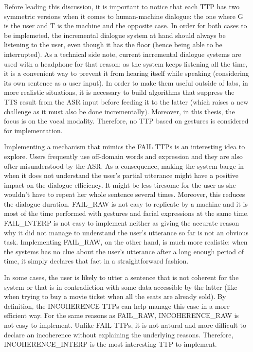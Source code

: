           Before leading this discussion, it is important to notice that each TTP has two symmetric versions when it comes to human-machine dialogue: the one where G is the user and T is the machine and the opposite case. In order for both cases to be implemeted, the incremental dialogue system at hand should always be listening to the user, even though it has the floor (hence being able to be interrupted). As a technical side note, current incremental dialogue systems are used with a headphone for that reason: as the system keeps listening all the time, it is a convenient way to prevent it from hearing itself while speaking (considering its own sentence as a user input). In order to make them useful outside of labs, in more realistic situations, it is necessary to build algorithms that suppress the TTS result from the ASR input before feeding it to the latter (which raises a new challenge as it must also be done incrementally). Moreover, in this thesis, the focus is on the vocal modality. Therefore, no TTP based on gestures is considered for implementation.

          Implementing a mechanism that mimics the FAIL TTPs is an interesting idea to explore. Users frequently use off-domain words and expression \cite{Ghigi2014} and they are also ofter misunderstood by the ASR. As a consequence, making the system barge-in when it does not understand the user's partial utterance might have a positive impact on the dialogue efficiency. It might be less tiresome for the user as she wouldn't have to repeat her whole sentence several times. Moreover, this reduces the dialogue duration. FAIL\_RAW is not easy to replicate by a machine and it is most of the time performed with gestures and facial expressions at the same time. FAIL\_INTERP is not easy to implement neither as giving the accurate reason why it did not manage to understand the user's utterance so far is not an obvious task. Implementing FAIL\_RAW, on the other hand, is much more realistic: when the systems has no clue about the user's utterance after a long enough period of time, it simply declares that fact in a straightforward fashion.

          In some cases, the user is likely to utter a sentence that is not coherent for the system or that is in contradiction with some data accessible by the latter (like when trying to buy a movie ticket when all the seats are already sold). By definition, the INCOHERENCE TTPs can help manage this case in a more efficient way. For the same reasons as FAIL\_RAW, INCOHERENCE\_RAW is not easy to implement. Unlike FAIL TTPs, it is not natural and more difficult to declare an incoherence without explaining the underlying reasons. Therefore, INCOHERENCE\_INTERP is the most interesting TTP to implement.

